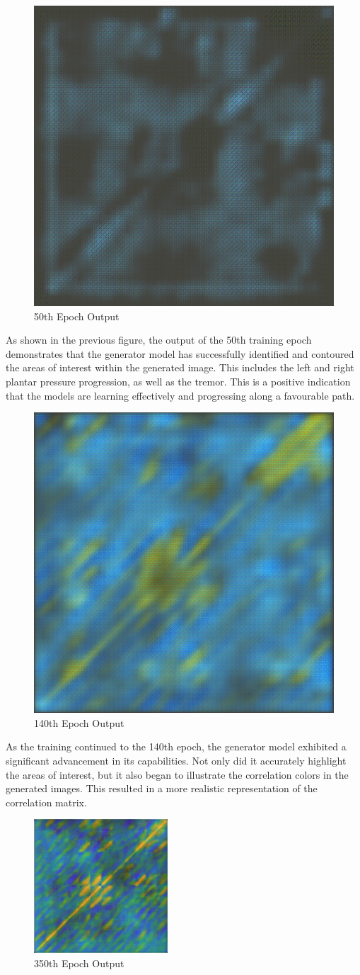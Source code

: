 \documentclass[12pt]{article}
\begin{document}
\begin{figure}[h]
\includegraphics[width=5 cm]{generated50.png}
\centering
\caption{50th Epoch Output}
\end{figure}

As shown in the previous figure, the output of the 50th training epoch demonstrates that the generator model has successfully identified and contoured the areas of interest within the generated image. This includes the left and right plantar pressure progression, as well as the tremor. This is a positive indication that the models are learning effectively and progressing along a favourable path.
\newpage

\begin{figure}[h]
    \includegraphics[width=5 cm]{generated150.png}
    \centering
    \caption{140th Epoch Output}
\end{figure}

As the training continued to the 140th epoch, the generator model exhibited a significant advancement in its capabilities. Not only did it accurately highlight the areas of interest, but it also began to illustrate the correlation colors in the generated images. This resulted in a more realistic representation of the correlation matrix.

\begin{figure}[h]
\centering
\includegraphics[width=5cm]{generated350.png}
\caption{350th Epoch Output}
\end{figure}
\end{document}

